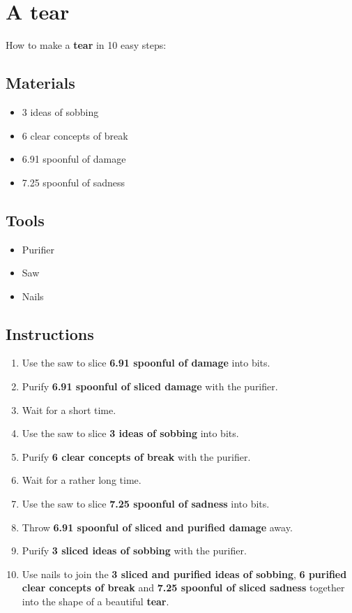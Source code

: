 \documentclass{article}
\begin{document}
\section{A tear}How to make a \textbf{tear} in 10 easy steps:

\subsection{Materials}\begin{itemize}
\item 
3 ideas of sobbing
\item 
6 clear concepts of break
\item 
6.91 spoonful of damage
\item 
7.25 spoonful of sadness
\end{itemize}
\subsection{Tools}\begin{itemize}
\item 
Purifier
\item 
Saw
\item 
Nails
\end{itemize}
\subsection{Instructions}\begin{enumerate}
\item 
Use the saw to slice \textbf{6.91 spoonful of damage} into bits.
\item 
Purify \textbf{6.91 spoonful of sliced damage} with the purifier.
\item 
Wait for a short time.
\item 
Use the saw to slice \textbf{3 ideas of sobbing} into bits.
\item 
Purify \textbf{6 clear concepts of break} with the purifier.
\item 
Wait for a rather long time.
\item 
Use the saw to slice \textbf{7.25 spoonful of sadness} into bits.
\item 
Throw \textbf{6.91 spoonful of sliced and purified damage} away.
\item 
Purify \textbf{3 sliced ideas of sobbing} with the purifier.
\item 
Use nails to join the \textbf{3 sliced and purified ideas of sobbing}, \textbf{6 purified clear concepts of break} and \textbf{7.25 spoonful of sliced sadness} together into the shape of a beautiful \textbf{tear}.
\end{enumerate}
\newpage
\end{document}

